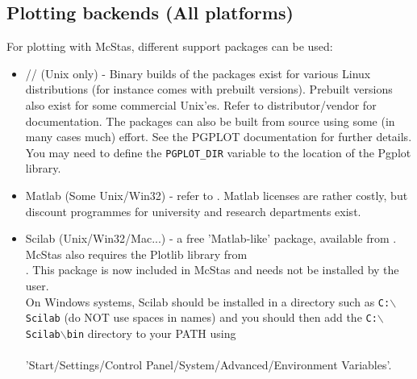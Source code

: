 \subsection{Plotting backends (All platforms)}
\label{s:plotting}
For plotting with McStas, different support packages can be used:
\begin{itemize}
\item{// (Unix only) - Binary builds of the packages
    exist for various Linux distributions (for instance
     comes with
    prebuilt versions). Prebuilt versions also exist for some commercial Unix'es. 
    Refer to distributor/vendor for documentation. The packages can also be
    built from source using some (in many cases much) effort.  See the
    PGPLOT documentation for further details. 
    You may need to define the \verb+PGPLOT_DIR+ variable to the location of the Pgplot library. }
\item{Matlab (Some Unix/Win32) - refer to
    . Matlab licenses are rather costly, but discount programmes for university and research departments exist.}
\item{Scilab (Unix/Win32/Mac...) - a free 'Matlab-like' package, available from
    . McStas also requires the Plotlib library from \\ . This package is now included in McStas and needs not be installed by the user.
    \\
On Windows systems, Scilab should be installed in a directory such as \texttt{C:$\backslash$Scilab} (do NOT use spaces in names) and you should then add the \texttt{C:$\backslash$Scilab$\backslash$bin} directory to your PATH using\\\ \\
'Start/Settings/Control Panel/System/Advanced/Environment Variables'.}
\end{itemize}

